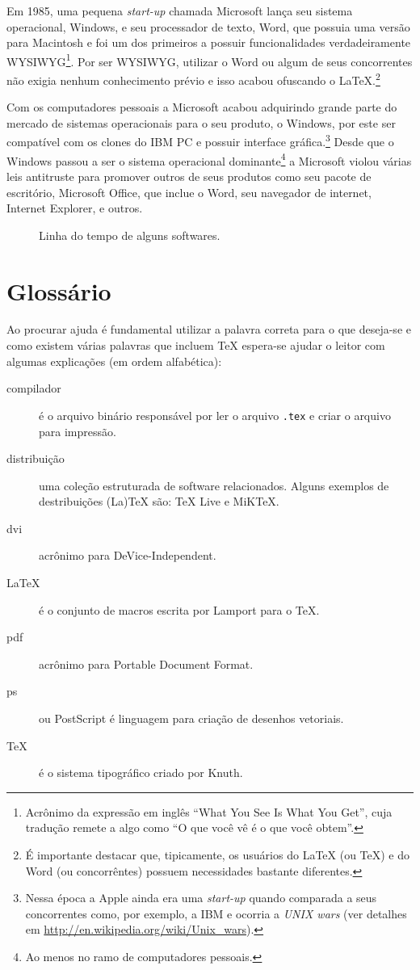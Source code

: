 Em 1985, uma pequena \textit{start-up} chamada Microsoft lança seu sistema
operacional, Windows, e seu processador de texto, Word, que possuia uma versão
para Macintosh e foi um dos primeiros a possuir funcionalidades verdadeiramente
WYSIWYG\footnote{Acrônimo da expressão em inglês ``What You See Is What You
Get'', cuja tradução remete a algo como ``O que você vê é o que você obtem''.}.
Por ser WYSIWYG,  utilizar o Word ou algum de seus concorrentes não exigia
nenhum conhecimento prévio e isso acabou ofuscando o LaTeX.\footnote{É
importante destacar que, tipicamente, os usuários do LaTeX (ou TeX) e do Word
(ou concorrêntes) possuem necessidades bastante diferentes.}

Com os computadores pessoais a Microsoft acabou adquirindo grande parte do
mercado de sistemas operacionais para o seu produto, o Windows, por este ser
compatível com os clones do IBM PC e possuir interface gráfica.\footnote{Nessa
época a Apple ainda era uma \textit{start-up} quando comparada a seus
concorrentes como, por exemplo, a IBM e ocorria a \textit{UNIX wars} (ver
detalhes em \url{http://en.wikipedia.org/wiki/Unix_wars}).} Desde que o Windows
passou a ser o sistema operacional dominante\footnote{Ao menos no ramo de
computadores pessoais.} a Microsoft violou várias leis antitruste para promover
outros de seus produtos como seu pacote de escritório, Microsoft Office, que
inclue o Word, seu navegador de internet, Internet Explorer, e outros.

\begin{figure}[htb]
  \begin{center}
    
  \end{center}
  \caption{Linha do tempo de alguns softwares.}
  \label{fig:history_timeline}
\end{figure}

\section{Glossário}
Ao procurar ajuda é fundamental utilizar a palavra correta para o que deseja-se
e como existem várias palavras que incluem TeX espera-se ajudar o leitor com
algumas explicações (em ordem alfabética):
\begin{description}
  \item[compilador] é o arquivo binário responsável por ler o arquivo
    \lstinline+.tex+ e criar o arquivo para impressão.
  \item[distribuição] uma coleção estruturada de software relacionados.
    Alguns exemplos de destribuições (La)TeX são: TeX Live e MiKTeX.
  \item[dvi] acrônimo para DeVice-Independent.
  \item[LaTeX] é o conjunto de macros escrita por Lamport para o TeX.
  \item[pdf] acrônimo para Portable Document Format.
  \item[ps] ou PostScript é linguagem para criação de desenhos vetoriais.
  \item[TeX] é o sistema tipográfico criado por Knuth.
\end{description}
